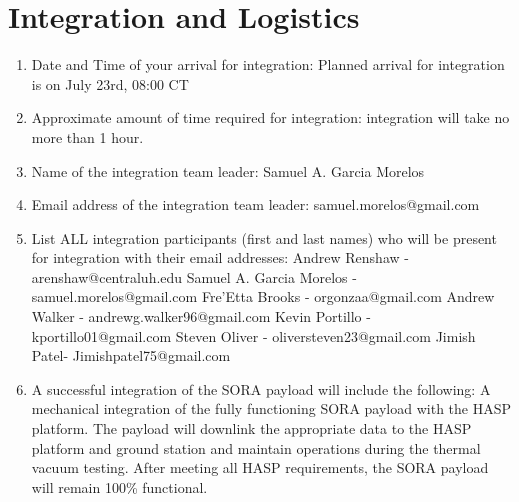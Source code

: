 \newline
\section{Integration and Logistics}
\label{sec:Logistics}

\hspace*{0.5cm}
\begin{minipage}{\linewidth-0.5cm}
  \begin{enumerate}[label = \Alph*.]
    
  \item Date and Time of your arrival for integration: Planned arrival for integration is on July 23rd, 08:00 CT
    
  \item Approximate amount of time required for integration: integration will take no more than 1 hour.
    
  \item Name of the integration team leader: Samuel A. Garcia Morelos
    
  \item Email address of the integration team leader: samuel.morelos@gmail.com

  \item List ALL integration participants (first and last names) who will be present for integration with their email addresses: \newline
        Andrew Renshaw - arenshaw@centraluh.edu \newline
        Samuel A. Garcia Morelos - samuel.morelos@gmail.com \newline
        Fre’Etta Brooks - orgonzaa@gmail.com \newline
        Andrew Walker - andrewg.walker96@gmail.com \newline
        Kevin Portillo - kportillo01@gmail.com \newline
        Steven Oliver - oliversteven23@gmail.com \newline
        Jimish Patel- Jimishpatel75@gmail.com \newline

  \item A successful integration of the SORA payload will include the following: \newline
        A mechanical integration of the fully functioning SORA payload with the HASP platform. The payload will downlink the appropriate data to the HASP platform and ground station and maintain operations during the thermal vacuum testing. After meeting all HASP requirements, the SORA payload will remain 100\% functional.


\end{enumerate}
\end{minipage}
